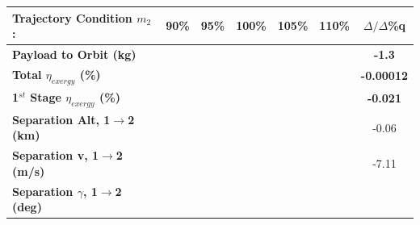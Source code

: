 \begin{table}[ht]
	\centering
	
	\begin{tabular}{l c c c c c c} %
	\hline \textbf{Trajectory Condition  \qquad  $m_{2}$: }
	&90\%
	&95\%
	&100\%
	& 105\%
	& 110\%
	& $\Delta/\Delta$\%q
		\\
		\hline \textbf{Payload to Orbit (kg)}
		& \textbf{\PayloadToOrbitmSPARTANNinetyNoReturn}
		& \textbf{\PayloadToOrbitmSPARTANNinetyFiveNoReturn}
		& \textbf{\PayloadToOrbitmSPARTANStandardNoReturn}
		& \textbf{\PayloadToOrbitmSPARTANOneHundredFiveNoReturn}
		& \textbf{\PayloadToOrbitmSPARTANOneHundredTenNoReturn}
		&\textbf{-1.3}
		\\
		\textbf{Total $\eta_{exergy}$ (\%)}
		& \textbf{\totalExergyEffmSPARTANNinetyNoReturn}
		& \textbf{\totalExergyEffmSPARTANNinetyFiveNoReturn}
		& \textbf{\totalExergyEffmSPARTANStandardNoReturn}
		& \textbf{\totalExergyEffmSPARTANOneHundredFiveNoReturn}
		& \textbf{\totalExergyEffmSPARTANOneHundredTenNoReturn}
		& \textbf{-0.00012}
		\\
		\hline 
		\textbf{1$^{st}$ Stage $\eta_{exergy}$ (\%)}
		& \textbf{\firstExergyEffmSPARTANNinetyNoReturn}
		& \textbf{\firstExergyEffmSPARTANNinetyFiveNoReturn}
		& \textbf{\firstExergyEffmSPARTANStandardNoReturn}
		& \textbf{\firstExergyEffmSPARTANOneHundredFiveNoReturn}
		& \textbf{\firstExergyEffmSPARTANOneHundredTenNoReturn}
		& \textbf{-0.021}
		\\
		\textbf{Separation Alt, 1$\rightarrow$2 (km)}
		& \firstsecondSeparationAltmSPARTANNinetyNoReturn
		& \firstsecondSeparationAltmSPARTANNinetyFiveNoReturn
		& \firstsecondSeparationAltmSPARTANStandardNoReturn
		& \firstsecondSeparationAltmSPARTANOneHundredFiveNoReturn
		& \firstsecondSeparationAltmSPARTANOneHundredTenNoReturn
		&-0.06
		\\
		\textbf{Separation v, 1$\rightarrow$2 (m/s)}
		& \firstsecondSeparationvmSPARTANNinetyNoReturn
		& \firstsecondSeparationvmSPARTANNinetyFiveNoReturn
		& \firstsecondSeparationvmSPARTANStandardNoReturn
		& \firstsecondSeparationvmSPARTANOneHundredFiveNoReturn
		& \firstsecondSeparationvmSPARTANOneHundredTenNoReturn
		&-7.11
		\\
		\textbf{Separation $\gamma$, 1$\rightarrow$2 (deg)}
		& \firstsecondSeparationgammamSPARTANNinetyNoReturn
		& \firstsecondSeparationgammamSPARTANNinetyFiveNoReturn
		& \firstsecondSeparationgammamSPARTANStandardNoReturn
		& \firstsecondSeparationgammamSPARTANOneHundredFiveNoReturn
		& \firstsecondSeparationgammamSPARTANOneHundredTenNoReturn

\end{tabular}
\end{table}
